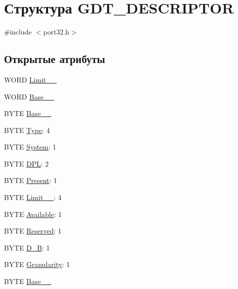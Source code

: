 \hypertarget{struct_g_d_t___d_e_s_c_r_i_p_t_o_r}{\section{Структура G\-D\-T\-\_\-\-D\-E\-S\-C\-R\-I\-P\-T\-O\-R}
\label{struct_g_d_t___d_e_s_c_r_i_p_t_o_r}
}


{\ttfamily \#include $<$port32.\-h$>$}

\subsection*{Открытые атрибуты}
\begin{DoxyCompactItemize}
\item 
W\-O\-R\-D \hyperlink{struct_g_d_t___d_e_s_c_r_i_p_t_o_r_a20fd73c987977362df1255fc31e3c11a}{Limit\-\_\-\_}
\item 
W\-O\-R\-D \hyperlink{struct_g_d_t___d_e_s_c_r_i_p_t_o_r_a29a65e3c14e1db7f26c1f9a966b18137}{Base\-\_\-\_}
\item 
B\-Y\-T\-E \hyperlink{struct_g_d_t___d_e_s_c_r_i_p_t_o_r_a05f837136a8161a177b913d54e280455}{Base\-\_\-\_}
\item 
B\-Y\-T\-E \hyperlink{struct_g_d_t___d_e_s_c_r_i_p_t_o_r_a7875b149b70ca0abd23487c9a3a96417}{Type}\-: 4
\item 
B\-Y\-T\-E \hyperlink{struct_g_d_t___d_e_s_c_r_i_p_t_o_r_acf65b08e34d157832056883fc198523a}{System}\-: 1
\item 
B\-Y\-T\-E \hyperlink{struct_g_d_t___d_e_s_c_r_i_p_t_o_r_acac08c5e2496537d23fe40f03224c454}{D\-P\-L}\-: 2
\item 
B\-Y\-T\-E \hyperlink{struct_g_d_t___d_e_s_c_r_i_p_t_o_r_a4f07fa72b50c66855d0a582d3701e866}{Present}\-: 1
\item 
B\-Y\-T\-E \hyperlink{struct_g_d_t___d_e_s_c_r_i_p_t_o_r_a6ef097af160b47a24ac824de70fd0a5d}{Limit\-\_\-\_}\-: 4
\item 
B\-Y\-T\-E \hyperlink{struct_g_d_t___d_e_s_c_r_i_p_t_o_r_af9f6f5eaea2073ca3a17e4150dde30bc}{Available}\-: 1
\item 
B\-Y\-T\-E \hyperlink{struct_g_d_t___d_e_s_c_r_i_p_t_o_r_ae91387f066705b2ce924e22b183d4ccb}{Reserved}\-: 1
\item 
B\-Y\-T\-E \hyperlink{struct_g_d_t___d_e_s_c_r_i_p_t_o_r_ac680a3f7e94b80208630f9213faca6d1}{D\-\_\-\-B}\-: 1
\item 
B\-Y\-T\-E \hyperlink{struct_g_d_t___d_e_s_c_r_i_p_t_o_r_ad0360b23acceb93dafa9090aeb7df955}{Granularity}\-: 1
\item 
B\-Y\-T\-E \hyperlink{struct_g_d_t___d_e_s_c_r_i_p_t_o_r_a191cd522c55ffd6c040da2b1110774a2}{Base\-\_\-\_}
\end{DoxyCompactItemize}


